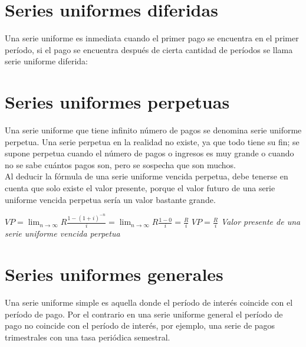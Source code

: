 \section{Series uniformes diferidas}
Una serie uniforme es inmediata cuando el primer pago se encuentra en el primer período, si el pago se encuentra después de cierta cantidad de períodos se llama serie uniforme diferida: \\




\section{Series uniformes perpetuas}

Una serie uniforme que tiene infinito número de pagos se denomina serie uniforme perpetua. Una serie perpetua en la realidad no existe, ya que todo tiene su fin; se supone perpetua cuando el número de pagos o ingresos es muy grande o cuando no se sabe cuántos pagos son, pero se sospecha que son muchos.\\
\newline
\newline
Al deducir la fórmula de una serie uniforme vencida perpetua, debe tenerse en cuenta que solo existe el valor presente, porque el valor futuro de una serie uniforme vencida perpetua sería un valor bastante grande.\\
\begin{center}
    $ VP = \lim_{n\to \infty}R\frac{1-(1+i)^{-n}}{i} = \lim_{n\to \infty} R\frac{1-0}{i} = \frac{R}{i}$
    \newline
    \newline
    $ VP = \frac{R}{i}$ \hspace{35pt}\textit{Valor presente de una serie uniforme vencida perpetua} 
    \newline
    \newline
\end{center}





\section{Series uniformes generales}

Una serie uniforme simple es aquella donde el período de interés coincide con el período de pago. Por el contrario en una serie uniforme general el período de pago no coincide con el período de interés, por ejemplo, una serie de pagos trimestrales con una tasa periódica semestral.\\

